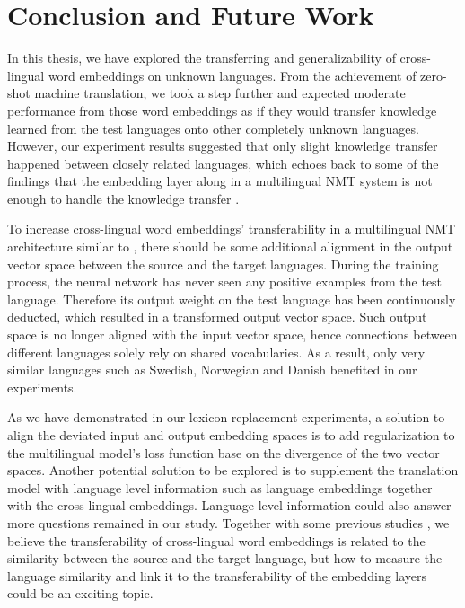 \documentclass[thesis,fonts=libertine]{cluu}
\begin{document}
\chapter{Conclusion and Future Work}
\label{chap:conclusion}

In this thesis, we have explored the transferring and generalizability of cross-lingual word embeddings on unknown languages. From the achievement of zero-shot machine translation, we took a step further and expected moderate performance from those word embeddings as if they would transfer knowledge learned from the test languages onto other completely unknown languages. However, our experiment results suggested that only slight knowledge transfer happened between closely related languages, which echoes back to some of the findings that the embedding layer along in a multilingual NMT system is not enough to handle the knowledge transfer \parencite{aji-etal-2020-neural}.

To increase cross-lingual word embeddings' transferability in a multilingual NMT architecture similar to \textcite{Johnson:2016aa}, there should be some additional alignment in the output vector space between the source and the target languages. During the training process, the neural network has never seen any positive examples from the test language. Therefore its output weight on the test language has been continuously deducted, which resulted in a transformed output vector space. Such output space is no longer aligned with the input vector space, hence connections between different languages solely rely on shared vocabularies. As a result, only very similar languages such as Swedish, Norwegian and Danish benefited in our experiments.

As we have demonstrated in our lexicon replacement experiments, a solution to align the deviated input and output embedding spaces is to add regularization to the multilingual model's loss function base on the divergence of the two vector spaces. Another potential solution to be explored is to supplement the translation model with language level information such as language embeddings \parencite{littell-etal-2017-uriel,malaviya-etal-2017-learning} together with the cross-lingual embeddings. Language level information could also answer more questions remained in our study. Together with some previous studies \parencite{Qi:2018aa,aji-etal-2020-neural}, we believe the transferability of cross-lingual word embeddings is related to the similarity between the source and the target language, but how to measure the language similarity and link it to the transferability of the embedding layers could be an exciting topic.
\end{document}

